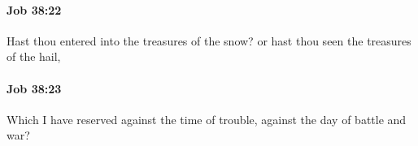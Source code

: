 		\paragraph{Job 38:22} %
			\label{JOB-38-22}

			Hast thou entered into the treasures of the snow? or hast thou seen the treasures of the hail,


		\paragraph{Job 38:23} %
			\label{JOB-38-23}

			Which I have reserved against the time of trouble, against the day of battle and war?


